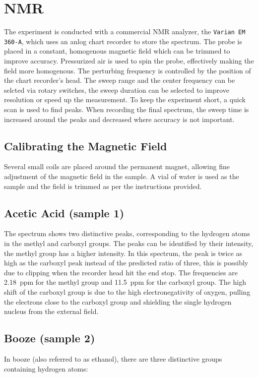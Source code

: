 \chapter{NMR}
The experiment is conducted with a commercial NMR analyzer, the \texttt{Varian EM 360-A}, which uses an anlog chart recorder to store the spectrum.
The probe is placed in a constant, homogenous magnetic field which can be trimmed to improve accuracy.
Pressurized air is used to spin the probe, effectively making the field more homogenous. %
The perturbing frequency is controlled by the position of the chart recorder's head.
The sweep range and the center frequency can be selcted via rotary switches, the sweep duration can be selected to improve resolution or speed up the measurement.
To keep the experiment short, a quick scan is used to find peaks.
When recording the final spectrum, the sweep time is increased around the peaks and decreased where accuracy is not important.

\section{Calibrating the Magnetic Field}
Several small coils are placed around the permanent magnet, allowing fine adjustment of the magnetic field in the sample.
A vial of water is used as the sample and the field is trimmed as per the instructions provided.


\section{Acetic Acid (sample 1)}
The spectrum shows two distinctive peaks, corresponding to the hydrogen atoms in the methyl and carboxyl groups.
The peaks can be identified by their intensity, the methyl group has a higher intensity.
In this spectrum, the peak is twice as high as the carboxyl peak instead of the predicted ratio of three, this is possibly due to clipping when the recorder head hit the end stop.
The frequencies are \SI{2.18}{ppm} for the methyl group and \SI{11.5}{ppm} for the carboxyl group.
The high shift of the carboxyl group is due to the high electronegativity of oxygen, pulling the electrons close to the carboxyl group and shielding the single hydrogen nucleus from the external field.

\section{Booze (sample 2)}
In booze (also referred to as ethanol), there are three distinctive groups containing hydrogen atoms:

